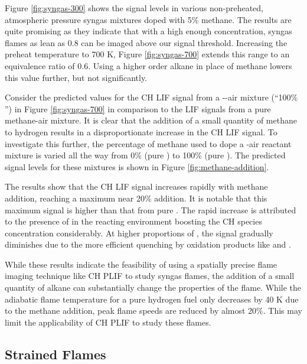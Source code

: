 Figure \ref{fig:syngas-300} shows the signal levels in various non-preheated, atmospheric pressure syngas mixtures doped with 5\% methane.
The results are quite promising as they indicate that with a high enough  concentration, syngas flames as lean as 0.8 can be imaged above our signal threshold.
Increasing the preheat temperature to 700 K, Figure \ref{fig:syngas-700} extends this range to an equivalence ratio of 0.6.
Using a higher order alkane in place of methane lowers this value further, but not significantly.




Consider the predicted values for the CH LIF signal from a --air mixture (``100\% '') in Figure \ref{fig:syngas-700} in comparison to the LIF signals from a pure methane-air mixture.
It is clear that the addition of a small quantity of methane to hydrogen results in a disproportionate increase in the CH LIF signal.
To investigate this further, the percentage of methane used to dope a -air reactant mixture is varied all the way from 0\% (pure ) to 100\% (pure ).
The predicted signal levels for these mixtures is shown in Figure \ref{fig:methane-addition}.



The results show that the CH LIF signal increases rapidly with methane addition, reaching a maximum near 20\%  addition.
It is notable that this maximum signal is higher than that from pure .
The rapid increase is attributed to the presence of  in the reacting environment boosting the CH species concentration considerably.
At higher proportions of , the signal gradually diminishes due to the more efficient quenching by  oxidation products like  and .

While these results indicate the feasibility of using a spatially precise flame imaging technique like CH PLIF to study syngas flames, the addition of a small quantity of alkane can substantially change the properties of the flame.
While the adiabatic flame temperature for a pure hydrogen fuel only decreases by 40 K due to the methane addition, peak flame speeds are reduced by almost 20\%.
This may limit the applicability of CH PLIF to study these flames.

\subsection{Strained Flames}

